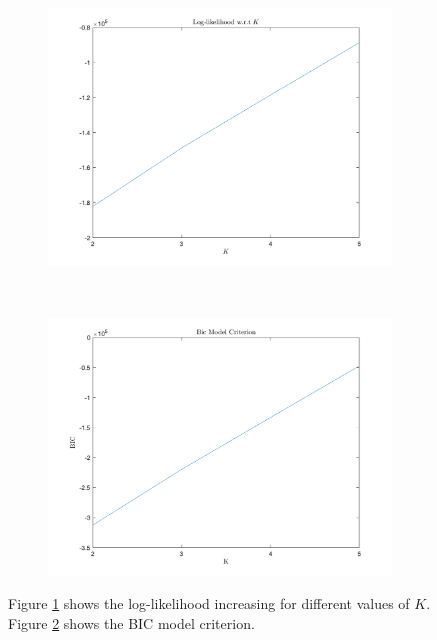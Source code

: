 \documentclass[12pt]{article}
\begin{document}
\begin{figure}[h]
	\centering
	\begin{subfigure}{0.4\textwidth}
		\includegraphics[width=\textwidth]{images/MAP/ll_MAP.png}
		\caption{}
		\label{fig:ll_MAP}
	\end{subfigure}
	~	
	\begin{subfigure}{0.4\textwidth}
		\includegraphics[width=\textwidth]{images/MAP/BIC_MAP.png}
		\caption{}
		\label{fig:bic}
	\end{subfigure}
	\caption{Figure \ref{fig:ll_MAP} shows the log-likelihood increasing for different values of $K$. Figure \ref{fig:bic} shows the BIC model criterion.}
	\label{fig:ll_bic}
\end{figure}
\end{document}
